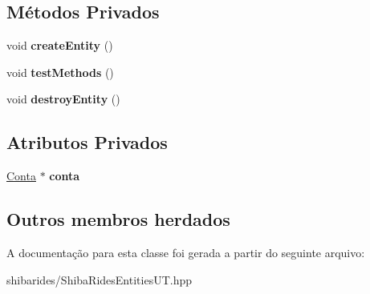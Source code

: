 \subsection*{Métodos Privados}
\begin{DoxyCompactItemize}
\item 
void {\bfseries create\+Entity} ()\hypertarget{classshibarides_1_1TUConta_a587cea7758d2d1057c04ed28b08a88ff}{}\label{classshibarides_1_1TUConta_a587cea7758d2d1057c04ed28b08a88ff}

\item 
void {\bfseries test\+Methods} ()\hypertarget{classshibarides_1_1TUConta_ae389936278e33d9674dacd244a85a231}{}\label{classshibarides_1_1TUConta_ae389936278e33d9674dacd244a85a231}

\item 
void {\bfseries destroy\+Entity} ()\hypertarget{classshibarides_1_1TUConta_aa36badc4c76527d58967a6587322e677}{}\label{classshibarides_1_1TUConta_aa36badc4c76527d58967a6587322e677}

\end{DoxyCompactItemize}
\subsection*{Atributos Privados}
\begin{DoxyCompactItemize}
\item 
\hyperlink{classshibarides_1_1Conta}{Conta} $\ast$ {\bfseries conta}\hypertarget{classshibarides_1_1TUConta_a9f6f3fce6eae9a97c60b1726f99daad6}{}\label{classshibarides_1_1TUConta_a9f6f3fce6eae9a97c60b1726f99daad6}

\end{DoxyCompactItemize}
\subsection*{Outros membros herdados}


A documentação para esta classe foi gerada a partir do seguinte arquivo\+:\begin{DoxyCompactItemize}
\item 
shibarides/Shiba\+Rides\+Entities\+U\+T.\+hpp\end{DoxyCompactItemize}
